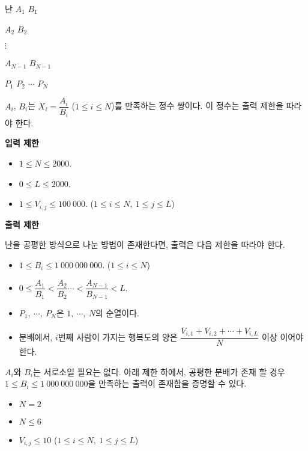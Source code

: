 \begin{problem}{난}
	$A_1$ $B_1$

	$A_2$ $B_2$

	$\vdots$ 
	
	$A_{N-1}$ $B_{N-1}$
	
	$P_1$ $P_2$ $\cdots$ $P_N$
	
	$A_i$, $B_i$는 $X_i = \dfrac{A_i}{B_i}$ ($1 \le i \le N$)를 만족하는 정수 쌍이다. 이 정수는 출력 제한을 따라야 한다.
	
	\Constraints


	{
	\large
	\textbf{입력 제한}
	}

	\begin{itemize}
		
		\item $1 \le N \le 2000$.
		\item $0 \le L \le 2000$.
		\item $1 \le V_{i, j} \le 100\ 000$. ($1 \le i \le N,\ 1 \le j \le L$)
	\end{itemize}

	{
	\large
	\textbf{출력 제한}
	}

	
	난을 공평한 방식으로 나눈 방법이 존재한다면, 출력은 다음 제한을 따라야 한다.
	
	\begin{itemize}
		\item $1 \le B_i \le 1\ 000\ 000\ 000$. ($1 \le i \le N$)
		\item $0 \le \dfrac{A_1}{B_1} < \dfrac{A_2}{B_2} \cdots < \dfrac{A_{N-1}}{B_{N-1}} < L$.
		\item $P_1, \ \cdots, \ P_N$은 $1, \ \cdots, \ N$의 순열이다.
		\item 분배에서, $i$번째 사람이 가지는 행복도의 양은 $\dfrac{V_{i, 1}+V_{i,2}+\cdots+V_{i,L}}{N}$ 이상 이어야 한다.
	\end{itemize}
	
	$A_i$와 $B_i$는 서로소일 필요는 없다.
	아래 제한 하에서, 공평한 분배가 존재 할 경우 $1 \le B_i \le 1\ 000\ 000\ 000$을 만족하는 출력이 존재함을 증명할 수 있다.
	
	\begin{itemize}
		\item $N = 2$
	\end{itemize}
	
	\begin{itemize}
		\item $N \le 6$ 
		\item $V_{i, j} \le 10$ ($1 \le i \le N,\ 1 \le j \le L$)
	\end{itemize}
	

\end{problem}
